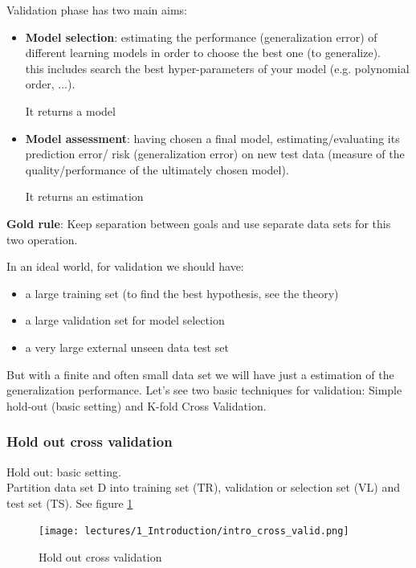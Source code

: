 \documentclass[../main.tex]{subfiles}
\begin{document}
Validation phase has two main aims:

\begin{itemize}
    \item \textbf{Model selection}: estimating the performance (generalization error) of different learning models in order to choose the best one (to generalize).\\
    this includes search the best hyper-parameters of your model (e.g. polynomial order, ...).
    \begin{center}
        It returns a model
    \end{center}
    
    \item \textbf{Model assessment}: having chosen a final model, estimating/evaluating its prediction error/ risk (generalization error) on new test data (measure of the quality/performance of the ultimately chosen model).
    \begin{center}
        It returns an estimation
    \end{center}
\end{itemize}

\noindent\textbf{Gold rule}: Keep separation between goals and use separate data sets for this two operation.

In an ideal world, for validation we should have:

\begin{itemize}
    \item a large training set (to find the best hypothesis, see the theory)

    \item a large validation set for model selection
    
    \item a very large external unseen data test set
\end{itemize}
But with a finite and often small data set we will have just a estimation of the generalization performance. Let's see two basic techniques for validation: Simple hold-out (basic setting) and K-fold Cross Validation.

\subsubsection{Hold out cross validation}
Hold out: basic setting.\\ 
Partition data set D into training set (TR), validation or selection set (VL) and test set (TS). See figure \ref{fig:intro_cross_valid}
\begin{figure}[H]
    \centering
    \texttt{[image: lectures/1\_Introduction/intro\_cross\_valid.png]}
    \caption{Hold out cross validation}
    \label{fig:intro_cross_valid}
\end{figure}
\end{document}
